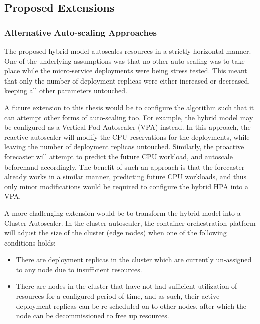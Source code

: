 \subsection{Proposed Extensions}
\label{subsec:ch6-extensions}

\subsubsection{Alternative Auto-scaling Approaches}
\label{subsubsec:ch6-alternate-auto}

The proposed hybrid model autoscales resources in a strictly horizontal manner. One of the underlying assumptions was that no other auto-scaling was to take place while the micro-service deployments were being stress tested. This meant that only the number of deployment replicas were either increased or decreased, keeping all other parameters untouched.\par

A future extension to this thesis would be to configure the algorithm such that it can attempt other forms of auto-scaling too. For example, the hybrid model may be configured as a Vertical Pod Autoscaler (VPA) instead. In this approach, the reactive autoscaler will modify the CPU reservations for the deployments, while leaving the number of deployment replicas untouched. Similarly, the proactive forecaster will attempt to predict the future CPU workload, and autoscale beforehand accordingly. The benefit of such an approach is that the forecaster already works in a similar manner, predicting future CPU workloads, and thus only minor modifications would be required to configure the hybrid HPA into a VPA.\par

A more challenging extension would be to transform the hybrid model into a Cluster Autoscaler. In the cluster autoscaler, the container orchestration platform will adjust the size of the cluster (edge nodes) when one of the following conditions holds:

\begin{itemize}
    \item There are deployment replicas in the cluster which are currently un-assigned to any node due to insufficient resources.
    \item There are nodes in the cluster that have not had sufficient utilization of resources for a configured period of time, and as such, their active deployment replicas can be re-scheduled on to other nodes, after which the node can be decommissioned to free up resources.
\end{itemize}

